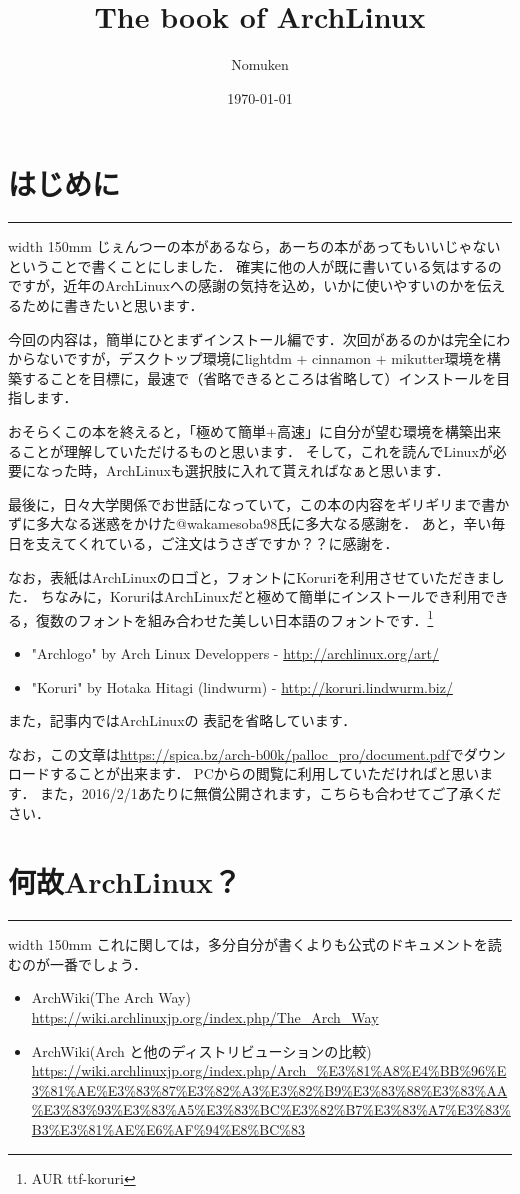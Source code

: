 \documentclass[b5j,twoside,openany]{jsbook}
\title{The book of ArchLinux}
\author{Nomuken}
\date{\today}
\newcommand{\linesection}[1]{\newpage \section{#1} \hrule width 150mm \vspace{3em}}
\begin{document}
  \linesection{はじめに}
    じぇんつーの本があるなら，あーちの本があってもいいじゃないということで書くことにしました．
    確実に他の人が既に書いている気はするのですが，近年のArchLinuxへの感謝の気持を込め，いかに使いやすいのかを伝えるために書きたいと思います．

    今回の内容は，簡単にひとまずインストール編です．次回があるのかは完全にわからないですが，デスクトップ環境にlightdm + cinnamon + mikutter環境を構築することを目標に，最速で（省略できるところは省略して）インストールを目指します．

    おそらくこの本を終えると，「極めて簡単+高速」に自分が望む環境を構築出来ることが理解していただけるものと思います．
    そして，これを読んでLinuxが必要になった時，ArchLinuxも選択肢に入れて貰えればなぁと思います．

    最後に，日々大学関係でお世話になっていて，この本の内容をギリギリまで書かずに多大なる迷惑をかけた@wakamesoba98氏に多大なる感謝を．
    あと，辛い毎日を支えてくれている，ご注文はうさぎですか？？に感謝を．

    なお，表紙はArchLinuxのロゴと，フォントにKoruriを利用させていただきました．
    ちなみに，KoruriはArchLinuxだと極めて簡単にインストールでき利用できる，復数のフォントを組み合わせた美しい日本語のフォントです．\footnote{AUR ttf-koruri}

    \begin{itemize}
      \item "Archlogo" by Arch Linux Developpers - \url{http://archlinux.org/art/}
      \item "Koruri" by Hotaka Hitagi (lindwurm) - \url{http://koruri.lindwurm.biz/}
    \end{itemize}

    また，記事内ではArchLinuxの \texttrademark 表記を省略しています．

    \vspace{3em}

    なお，この文章は\url{https://spica.bz/arch-b00k/palloc_pro/document.pdf}でダウンロードすることが出来ます．
    PCからの閲覧に利用していただければと思います．
    また，2016/2/1あたりに無償公開されます，こちらも合わせてご了承ください．

  \linesection{何故ArchLinux？}
    これに関しては，多分自分が書くよりも公式のドキュメントを読むのが一番でしょう．
    \begin{itemize}
      \item ArchWiki(The Arch Way) \\ \url{https://wiki.archlinuxjp.org/index.php/The_Arch_Way}
      \item ArchWiki(Arch と他のディストリビューションの比較) \\ \url{https://wiki.archlinuxjp.org/index.php/Arch_%E3%81%A8%E4%BB%96%E3%81%AE%E3%83%87%E3%82%A3%E3%82%B9%E3%83%88%E3%83%AA%E3%83%93%E3%83%A5%E3%83%BC%E3%82%B7%E3%83%A7%E3%83%B3%E3%81%AE%E6%AF%94%E8%BC%83}
    \end{itemize}
\end{document}

